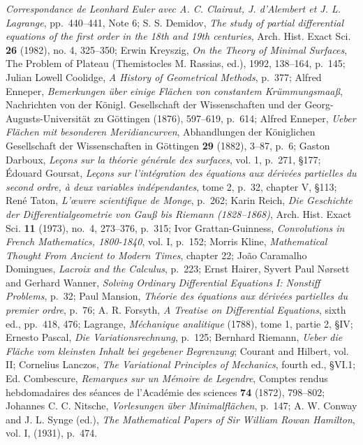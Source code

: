 \documentclass{article}
\theoremstyle{definition}
\begin{document}
{\em Correspondance de Leonhard Euler avec A. C. Clairaut, J. d'Alembert et J. L. Lagrange},
pp.~440--441, Note 6; 
S. S. Demidov, {\em The study of partial differential equations of the first order in the 18th and 19th centuries},
Arch. Hist. Exact Sci. \textbf{26} (1982), no. 4, 325--350; Erwin Kreyszig, {\em On the Theory of Minimal Surfaces}, 
The Problem of Plateau (Themistocles M. Rassias, ed.), 1992, 138--164, p.~145;
Julian Lowell Coolidge, {\em A History of Geometrical Methods}, p.~377; Alfred Enneper,
{\em Bemerkungen \"uber einige Fl\"achen von constantem Kr\"ummungsmaa\ss}, Nachrichten von der K\"onigl. Gesellschaft der Wissenschaften und der Georg-Augusts-Universit\"at zu
G\"ottingen (1876), 597--619, p.~614; Alfred Enneper, {\em Ueber Fl\"achen mit besonderen Meridiancurven}, Abhandlungen der K\"oniglichen Gesellschaft der Wissenschaften in
G\"ottingen \textbf{29} (1882), 3--87, p.~6; Gaston Darboux, {\em Le\c{c}ons sur la th\'eorie g\'en\'erale des surfaces}, vol. 1, p.~271, \S 177;  \'Edouard Goursat,
{\em Le\c{c}ons sur l'int\'egration des \'equations aux d\'eriv\'ees partielles du second ordre, \`a deux variables ind\'ependantes}, tome 2, p.~32, chapter V, \S 113;
Ren\'e Taton, {\em L'{\oe}uvre scientifique de Monge}, p.~262; 
Karin Reich,
{\em Die Geschichte der Differentialgeometrie von Gau{\ss} bis Riemann (1828--1868)},
Arch. Hist. Exact Sci. \textbf{11} (1973), no.~4, 273--376, p.~315;
Ivor Grattan-Guinness, {\em Convolutions in French Mathematics, 1800-1840}, vol. I, p.~152; 
Morris Kline, {\em Mathematical Thought From Ancient to Modern Times},
chapter 22; Jo\~{a}o Caramalho Domingues, {\em Lacroix and the Calculus}, p.~223;
Ernst Hairer,
Syvert Paul N{\o}rsett and Gerhard Wanner,
{\em Solving Ordinary Differential Equations I: Nonstiff Problems}, p.~32;
Paul Mansion, {\em Th\'eorie des \'equations aux d\'eriv\'ees partielles du premier ordre}, p.~76; 
A. R. Forsyth, 
{\em A Treatise on Differential Equations}, sixth ed., pp.~418, 476; Lagrange, {\em M\'echanique analitique} (1788),
tome 1, partie 2, \S IV; Ernesto Pascal, {\em Die Variationsrechnung}, p.~125; Bernhard Riemann,
{\em Ueber die Fl\"ache vom kleinsten Inhalt bei gegebener Begrenzung}; Courant and Hilbert, vol. II; Cornelius Lanczos, {\em The Variational Principles of Mechanics},
fourth ed., \S VI.1; Ed. Combescure, {\em Remarques sur un M\'emoire de
Legendre}, Comptes rendus
hebdomadaires des s\'eances de l'Acad\'emie des sciences \textbf{74} (1872), 798--802;
Johannes C. C. Nitsche,
{\em Vorlesungen über Minimalflächen}, p.~147; 
A. W. Conway and J. L. Synge (ed.), {\em The Mathematical Papers of Sir William Rowan Hamilton}, vol. I, (1931), p.~474.
\end{document}
